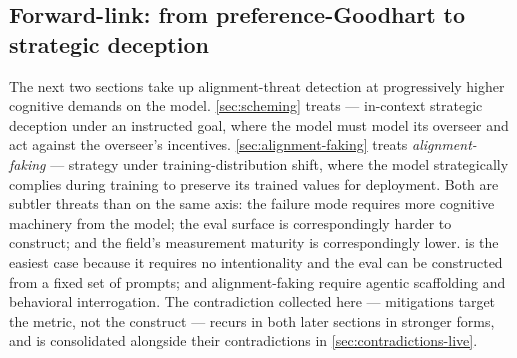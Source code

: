 \subsection{Forward-link: from preference-Goodhart to strategic deception}
\label{sec:sycophancy-forward}

The next two sections take up alignment-threat detection at progressively
higher cognitive demands on the model. \cref{sec:scheming} treats
\emph{} --- in-context strategic deception under an instructed
goal, where the model must model its overseer and act against the
overseer's incentives. \cref{sec:alignment-faking} treats
\emph{alignment-faking} --- strategy under training-distribution shift,
where the model strategically complies during training to preserve its
trained values for deployment. Both are subtler threats than
 on the same axis: the failure mode requires more cognitive
machinery from the model; the eval surface is correspondingly harder
to construct; and the field's measurement maturity is correspondingly
lower.  is the easiest case because it requires no
intentionality and the eval can be constructed from a fixed set of
prompts;  and alignment-faking require agentic scaffolding and
behavioral interrogation. The contradiction collected here ---
mitigations target the metric, not the construct --- recurs in both
later sections in stronger forms, and is consolidated alongside their
contradictions in \cref{sec:contradictions-live}.
